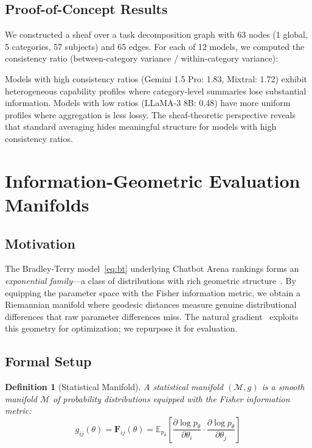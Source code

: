 \documentclass[11pt]{article}
\newtheorem{definition}[theorem]{Definition}
\newcommand{\cM}{\mathcal{M}}
\newcommand{\Fish}{\mathbf{F}}
\begin{document}
\subsection{Proof-of-Concept Results}

We constructed a sheaf over a task decomposition graph with 63 nodes (1 global, 5 categories, 57 subjects) and 65 edges. For each of 12 models, we computed the consistency ratio (between-category variance / within-category variance):

Models with high consistency ratios (Gemini 1.5 Pro: 1.83, Mixtral: 1.72) exhibit heterogeneous capability profiles where category-level summaries lose substantial information. Models with low ratios (LLaMA-3 8B: 0.48) have more uniform profiles where aggregation is less lossy. The sheaf-theoretic perspective reveals that standard averaging hides meaningful structure for models with high consistency ratios.

\section{Information-Geometric Evaluation Manifolds}
\label{sec:infogeo}

\subsection{Motivation}

The Bradley-Terry model~\eqref{eq:bt} underlying Chatbot Arena rankings forms an \emph{exponential family}---a class of distributions with rich geometric structure~\cite{amari2016information,ay2017information}. By equipping the parameter space with the Fisher information metric, we obtain a Riemannian manifold where geodesic distances measure genuine distributional differences that raw parameter differences miss. The natural gradient~\cite{amari1998natural,martens2020new} exploits this geometry for optimization; we repurpose it for evaluation.

\subsection{Formal Setup}

\begin{definition}[Statistical Manifold]
A \emph{statistical manifold} $(\cM, g)$ is a smooth manifold $\cM$ of probability distributions equipped with the \emph{Fisher information metric}:
\begin{equation}
g_{ij}(\theta) = \Fish_{ij}(\theta) = \mathbb{E}_{p_\theta}\left[\frac{\partial \log p_\theta}{\partial \theta_i} \cdot \frac{\partial \log p_\theta}{\partial \theta_j}\right]
\end{equation}
\end{definition}
\end{document}
